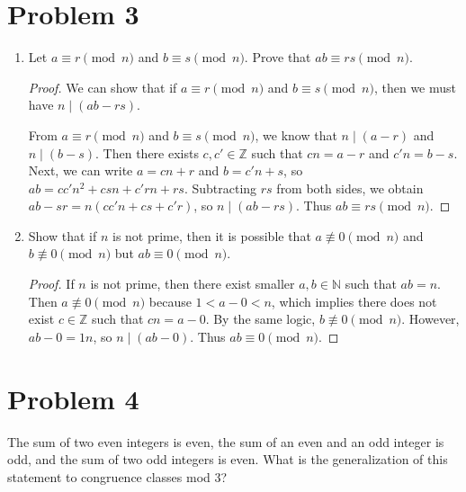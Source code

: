 \documentclass[12pt]{article}
\newcommand{\Z}{\mathbb{Z}}
\theoremstyle{definition}
\begin{document}
\section*{Problem 3}
\begin{enumerate}[label = (\alph*)]
    \item Let \(a\equiv r\pmod{n}\) and \(b\equiv s\pmod{n}\). Prove that \(ab\equiv rs\pmod{n}\).
    \begin{proof}
        We can show that if \(a\equiv r\pmod{n}\) and \(b\equiv s\pmod{n}\), then we must have \(n\mid (ab-rs)\).
        
        From \(a\equiv r\pmod{n}\) and \(b\equiv s\pmod{n}\), we know that \(n\mid (a-r)\) and \(n\mid (b-s)\). Then there exists \(c, c'\in\Z\) such that \(cn = a-r\) and \(c'n = b-s\). Next, we can write \(a=cn+r\) and \(b=c'n+s\), so \(ab = cc'n^2 + csn + c'rn + rs\). Subtracting \(rs\) from both sides, we obtain \(ab-sr = n(cc'n + cs + c'r)\), so \(n\mid (ab-rs)\). Thus \(ab\equiv rs\pmod{n}\).
    \end{proof}
    \item Show that if \(n\) is not prime, then it is possible that \(a\not\equiv 0\pmod{n}\) and \(b\not\equiv 0\pmod{n}\) but \(ab\equiv 0\pmod{n}\).
    \begin{proof}
        If \(n\) is not prime, then there exist smaller \(a,b\in\mathbb{N}\) such that \(ab=n\). Then \(a\not\equiv 0\pmod{n}\) because \(1<a-0<n\), which implies there does not exist \(c\in\Z\) such that \(cn=a-0\). By the same logic, \(b\not\equiv 0\pmod{n}\). However, \(ab-0 = 1n\), so \(n\mid (ab-0)\). Thus \(ab\equiv 0\pmod{n}\).
    \end{proof}
\end{enumerate}

\section*{Problem 4}
The sum of two even integers is even, the sum of an even and an odd integer is odd, and the sum
of two odd integers is even. What is the generalization of this statement to congruence classes mod
3?
\end{document}

